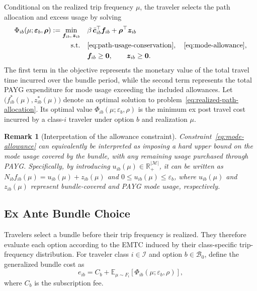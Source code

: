 \documentclass{article}
\newtheorem{remark}{Remark}
\begin{document}
Conditional on the realized trip frequency $\mu$, the traveler selects the path allocation and excess usage by solving
\begin{equation}
\label{eq:realized-path-allocation}
\begin{aligned}
\Phi_{ib}(\mu;\bm\varepsilon_b,\bm\rho)
:=
\min_{\bm f_{ib},\,\bm z_{ib}}
\quad&
\beta\,\bar{\bm c}_{ib}^{\top}\bm f_{ib}
+
\bm\rho^{\top}\bm z_{ib}
\\
\text{s.t.}\quad&
\eqref{eq:path-usage-conservation},
\quad
\eqref{eq:mode-allowance},
\\
&
\bm f_{ib}\geq\bm 0,
\qquad
\bm z_{ib}\geq\bm 0.
\end{aligned}
\end{equation}
The first term in the objective represents the monetary value of the total travel time incurred over the bundle period, while the second term represents the total PAYG expenditure for mode usage exceeding the included allowances. Let
$
\bigl(f_{ib}^*(\mu),z_{ib}^*(\mu)\bigr)
$
denote an optimal solution to problem~\eqref{eq:realized-path-allocation}. Its optimal value
$\Phi_{ib}(\mu;\varepsilon_b,\rho)$ is the minimum ex post travel cost incurred by a class-$i$ traveler under option $b$ and realization $\mu$.

\begin{remark}[Interpretation of the allowance constraint] Constraint~\eqref{eq:mode-allowance} can equivalently be interpreted as imposing a hard upper bound on the mode usage covered by the bundle, with any remaining usage purchased through PAYG. Specifically, by introducing $u_{ib}(\mu)\in\mathbb{R}_+^{|\mathcal M|}$, it can be written as $N_{ib}f_{ib}(\mu)=u_{ib}(\mu)+z_{ib}(\mu)$ and $0\leq u_{ib}(\mu)\leq\varepsilon_b$, where $u_{ib}(\mu)$ and $z_{ib}(\mu)$ represent bundle-covered and PAYG mode usage, respectively. \end{remark}

\subsection{Ex Ante Bundle Choice}

Travelers select a bundle before their trip frequency is realized. They therefore evaluate each option according to the EMTC induced by their class-specific trip-frequency distribution. For traveler class $i\in\mathcal I$ and option $b\in\mathcal B_0$, define the generalized bundle cost as
\begin{equation}
e_{ib}
=
C_b
+
\mathbb E_{\mu\sim F_i}
\left[
\Phi_{ib}(\mu;\varepsilon_b,\rho)
\right],
\label{eq:bundle-generalized-cost}
\end{equation}
where $C_b$ is the subscription fee.
\end{document}
